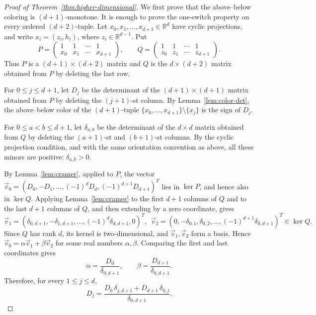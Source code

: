 \documentclass[11pt]{article}
\begin{document}
\begin{proof}[Proof of Theorem~\ref{thm:higher-dimensional}]
We first prove that the above--below coloring is $(d+1)$-monotone. It is enough to prove the one-switch property on every ordered $(d+2)$-tuple. Let $x_0,x_1,\ldots,x_{d+1}\in\mathbb R^d$ have cyclic projections, and write $x_i=(z_i,h_i)$, where
$z_i\in\mathbb R^{d-1}$. Put
\[
P=
\begin{pmatrix}
1&1&\cdots&1\\
x_0&x_1&\cdots&x_{d+1}
\end{pmatrix},
\qquad
Q=
\begin{pmatrix}
1&1&\cdots&1\\
z_0&z_1&\cdots&z_{d+1}
\end{pmatrix}.
\]
Thus $P$ is a $(d+1)\times(d+2)$ matrix and $Q$ is the $d\times(d+2)$ matrix
obtained from $P$ by deleting the last row.

For $0\le j\le d+1$, let $D_j$ be the determinant of the
$(d+1)\times(d+1)$ matrix obtained from $P$ by deleting the $(j+1)$-st column.
By Lemma~\ref{lem:color-det}, the above--below color of the $(d+1)$-tuple $\{x_0,\ldots,x_{d+1}\}\setminus\{x_j\}$ is the sign of $D_j$.

For $0\le a<b\le d+1$, let $\delta_{a,b}$ be the determinant of the
$d\times d$ matrix obtained from $Q$ by deleting the $(a+1)$-st and $(b+1)$-st
columns. By the cyclic projection condition, and with the same orientation
convention as above, all these minors are positive: $\delta_{a,b}>0$.

By Lemma~\ref{lem:cramer}, applied to $P$, the vector $\vec v_0=(D_0,-D_1,\ldots,(-1)^dD_d,(-1)^{d+1}D_{d+1})^T$ lies in $\ker P$, and hence also in $\ker Q$. Applying Lemma~\ref{lem:cramer}
to the first $d+1$ columns of $Q$ and to the last $d+1$ columns of $Q$, and
then extending by a zero coordinate, gives
\[
\vec v_1=(\delta_{0,d+1},-\delta_{1,d+1},\ldots,(-1)^d\delta_{d,d+1},0)^T,\ \ \vec v_2=(0,-\delta_{0,1},\delta_{0,2},\ldots,(-1)^{d+1}\delta_{0,d+1})^T
\in\ker Q.
\]
Since $Q$ has rank $d$, its kernel is two-dimensional, and $\vec v_1,\vec v_2$
form a basis. Hence $\vec v_0=\alpha\vec v_1+\beta\vec v_2$ for some real
numbers $\alpha,\beta$. Comparing the first and last coordinates gives
\[
\alpha=\frac{D_0}{\delta_{0,d+1}},
\qquad
\beta=\frac{D_{d+1}}{\delta_{0,d+1}}.
\]
Therefore, for every $1\le j\le d$,
\begin{equation}\label{eq:Dj-monotone-combination}
D_j
=
\frac{D_0\,\delta_{j,d+1}+D_{d+1}\,\delta_{0,j}}
     {\delta_{0,d+1}}.
\end{equation}


\end{proof}
\end{document}
